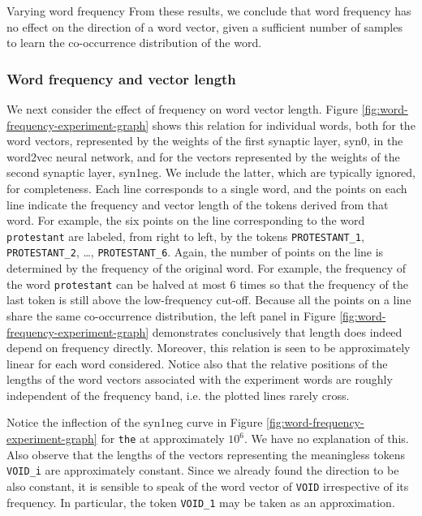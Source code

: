 \documentclass{article} %
\newcommand{\word}[1]{\texttt{#1}}
\begin{document}
\begin{section}{Varying word frequency}
From these results, we conclude that word frequency has no effect on the
direction of a word vector, given a sufficient number of samples to
learn the co-occurrence distribution of the word.

\subsubsection{Word frequency and vector length}
We next consider the effect of frequency on word vector length.
Figure \ref{fig:word-frequency-experiment-graph} shows this relation for
individual words, both for the word vectors, represented by the weights
of the first synaptic layer, syn0, in the word2vec neural network, and
for the vectors represented by the weights of the second synaptic layer,
syn1neg.  We include the latter, which are typically ignored, for
completeness.  Each line corresponds to a single word, and the points on
each line indicate the frequency and vector length of the tokens derived
from that word.  For example, the six points on the line corresponding
to the word \word{protestant} are labeled, from right to left, by the
tokens \word{PROTESTANT\_1}, \word{PROTESTANT\_2}, \dots,
\word{PROTESTANT\_6}.  Again, the number of points on the line is
determined by the frequency of the original word.  For example, the
frequency of the word \word{protestant} can be halved at most $6$ times
so that the frequency of the last token is still above the
low-frequency cut-off.  Because all the points on a line share the same
co-occurrence distribution, the left panel in
Figure \ref{fig:word-frequency-experiment-graph} demonstrates conclusively
that length does indeed depend on frequency directly.  Moreover, this
relation is seen to be approximately linear for each word considered.
Notice also that the relative positions of the lengths of the word vectors associated
with the experiment words are roughly independent of the frequency band,
i.e. the plotted lines rarely cross.

Notice the inflection of the syn1neg curve in
Figure \ref{fig:word-frequency-experiment-graph} for \word{the} at
approximately $10^6$.  We have no explanation of this.  Also observe
that the lengths of the vectors representing the meaningless tokens
\word{VOID\_i} are approximately constant.  Since we already found the
direction to be also constant, it is sensible to speak of the word
vector of \word{VOID} irrespective of its frequency.  In particular, the
token \word{VOID\_1} may be taken as an approximation.


\end{section}
\end{document}
